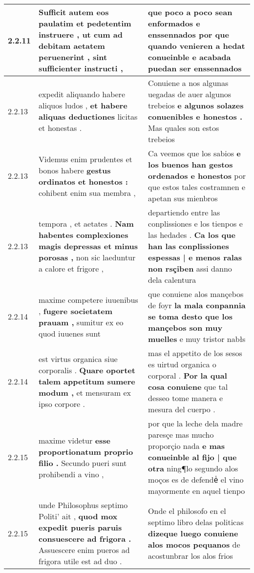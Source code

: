 \begin{tabular}{|p{1cm}|p{6.5cm}|p{6.5cm}|}
2.2.11 & Sufficit autem eos paulatim et pedetentim instruere , \textbf{ ut cum ad debitam aetatem peruenerint , } sint sufficienter instructi , & que poco a poco sean enformados e enssennados \textbf{ por que quando venieren a hedat } conueinble e acabada puedan ser enssennados \\\hline
2.2.13 & expedit aliquando habere aliquos ludos , \textbf{ et habere aliquas deductiones } licitas et honestas . & Conuiene a nos algunas uegadas de auer algunos trebeios \textbf{ e algunos solazes conuenibles e honestos . } Mas quales son estos trebeios \\\hline
2.2.13 & Videmus enim prudentes et bonos habere \textbf{ gestus ordinatos et honestos : } cohibent enim sua membra , & Ca veemos que los sabios \textbf{ e los buenos han gestos ordenados e honestos } por que estos tales costramnen e apetan sus mienbros \\\hline
2.2.13 & tempora , et aetates . \textbf{ Nam habentes complexiones magis depressas et minus porosas , } non sic laeduntur a calore et frigore , & departiendo entre las conplissiones e los tienpos e las hedades . \textbf{ Ca los que han las conplissiones espessas | e menos ralas non rsçiben } assi danno dela calentura \\\hline
2.2.14 & maxime competere iuuenibus , \textbf{ fugere societatem prauam , } sumitur ex eo quod iuuenes sunt & que conuiene alos mançebos de foyr \textbf{ la mala conpannia se toma desto que los mançebos son muy muelles } e muy tristor nabłs \\\hline
2.2.14 & est virtus organica siue corporalis . \textbf{ Quare oportet talem appetitum sumere modum , } et mensuram ex ipso corpore . & mas el appetito de los sesos es uirtud organica o corporal . \textbf{ Por la qual cosa conuiene } que tal desseo tome manera e mesura del cuerpo . \\\hline
2.2.15 & maxime videtur \textbf{ esse proportionatum proprio filio . } Secundo pueri sunt prohibendi a vino , & por que la leche dela madre paresçe mas mucho proporçio nada \textbf{ e mas conueinble al fijo | que otra } ning¶lo segundo alos moços es de defendeᷤ el vino mayormente en aquel tienpo \\\hline
2.2.15 & unde Philosophus septimo Politi’ ait , \textbf{ quod mox expedit pueris paruis consuescere ad frigora . } Assuescere enim pueros ad frigora utile est ad duo . & Onde el philosofo en el septimo libro delas politicas \textbf{ dizeque luego conuiene alos mocos pequanos } de acostunbrar los alos frios \\\hline

\end{tabular}
